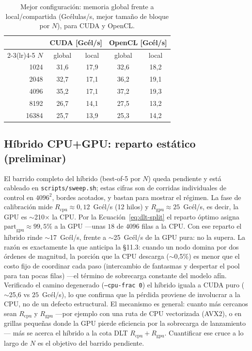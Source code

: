 \documentclass[
	spanish,
	letterpaper, oneside
]{article}
\begin{document}

\begin{table}[H]
	\centering
	\caption{Mejor configuración: memoria global frente a local/compartida
	(Gcélulas/s, mejor tamaño de bloque por $N$), para CUDA y OpenCL.}
	\label{tab:opt}
	\begin{tabular}{@{}rcccc@{}}
		\toprule
		    & \multicolumn{2}{c}{CUDA [Gcél/s]} & \multicolumn{2}{c}{OpenCL [Gcél/s]} \\
		\cmidrule(lr){2-3}\cmidrule(lr){4-5}
		$N$ & global & local & global & local \\
		\midrule
		1024  & 31{,}6 & 17{,}9 & 32{,}6 & 18{,}2 \\
		2048  & 32{,}7 & 17{,}1 & 36{,}2 & 19{,}1 \\
		4096  & 35{,}2 & 17{,}1 & 37{,}2 & 19{,}3 \\
		8192  & 26{,}7 & 14{,}1 & 27{,}5 & 13{,}2 \\
		16384 & 25{,}7 & 13{,}9 & 25{,}3 & 14{,}2 \\
		\bottomrule
	\end{tabular}
\end{table}

\subsection{Híbrido CPU+GPU: reparto estático (preliminar)}
\label{sec:res-hibrido}

El barrido completo del híbrido (best-of-5 por $N$) queda pendiente y está cableado
en \texttt{scripts/sweep.sh}; estas cifras son de corridas individuales de control
en $4096^2$, bordes acotados, y bastan para mostrar el régimen. La fase de
calibración mide $R_{\mathrm{cpu}}\approx0{,}12$~Gcél/s (12 hilos) y
$R_{\mathrm{gpu}}\approx25$~Gcél/s, es decir, la GPU es $\sim$210$\times$ la CPU. Por
la Ecuación~\ref{eq:dlt-split} el reparto óptimo asigna
$\mathrm{part}_{\mathrm{gpu}}\approx99{,}5\%$ a la GPU ---unas $18$ de $4096$ filas a
la CPU. Con ese reparto el híbrido rinde $\sim$17~Gcél/s, frente a $\sim$25~Gcél/s de
la GPU pura: no la supera. La razón es exactamente la que anticipa la
\S11.3: cuando un nodo domina por dos órdenes de magnitud, la porción que la CPU
descarga ($\sim$0{,}5\%) es menor que el costo fijo de coordinar cada paso
(intercambio de fantasmas y despertar el pool para tan pocas filas) ---el
término de sobrecarga constante del modelo afín. Verificado el camino degenerado
(\texttt{--cpu-frac 0}) el híbrido iguala a CUDA puro ($\sim$25,6 vs $25$~Gcél/s),
lo que confirma que la pérdida proviene de involucrar a la CPU, no de un defecto
estructural. El mecanismo es general: cuanto más cercanos sean
$R_{\mathrm{cpu}}$ y $R_{\mathrm{gpu}}$ ---por ejemplo con una ruta de CPU
vectorizada (AVX2), o en grillas pequeñas donde la GPU pierde eficiencia por la
sobrecarga de lanzamiento--- más se acerca el híbrido a la cota DLT
$R_{\mathrm{cpu}}+R_{\mathrm{gpu}}$. Cuantificar ese cruce a lo largo de $N$ es el
objetivo del barrido pendiente.
\end{document}
